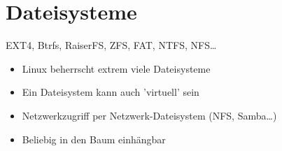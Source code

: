 \section[Dateisysteme]{Dateisysteme}
\begin{frame}{EXT4, Btrfs, RaiserFS, ZFS, FAT, NTFS, NFS…}
\begin{itemize}
\item Linux beherrscht extrem viele Dateisysteme
\item Ein Dateisystem kann auch 'virtuell' sein
\item Netzwerkzugriff per Netzwerk-Dateisystem (NFS, Samba…)
\item Beliebig in den Baum einhängbar
\end{itemize}
\end{frame}